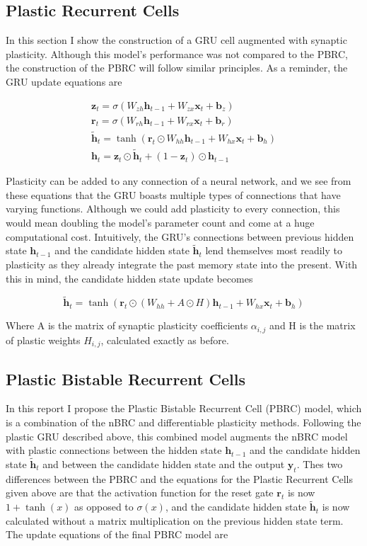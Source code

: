 \subsection*{Plastic Recurrent Cells}

In this section I show the construction of a GRU cell augmented with synaptic plasticity. Although this model's performance was not compared to the PBRC, the construction of the PBRC will follow similar principles.
As a reminder, the GRU update equations are

\begin{gather*}
	\mathbf{z}_t = \sigma(W_{zh} \mathbf{h}_{t-1} + W_{zx} \mathbf{x}_t + \mathbf{b}_z)\\
	\mathbf{r}_t = \sigma(W_{rh} \mathbf{h}_{t-1} + W_{rx} \mathbf{x}_t + \mathbf{b}_r)\\
	\mathbf{\tilde{h}}_t = \tanh(\mathbf{r}_t \odot W_{hh} \mathbf{h}_{t-1} + W_{hx} \mathbf{x}_t + \mathbf{b}_h)\\
	\mathbf{h}_t = \mathbf{z}_t \odot \mathbf{\tilde{h}}_t + (1 - \mathbf{z}_t) \odot \mathbf{h}_{t-1}
\end{gather*}

Plasticity can be added to any connection of a neural network, and we see from these equations that the GRU boasts multiple types of connections that have varying functions. Although we could add plasticity to every connection, this would mean doubling the model's parameter count and come at a huge computational cost. Intuitively, the GRU's connections between previous hidden state \(\mathbf{h}_{t-1}\) and the candidate hidden state \(\mathbf{\tilde{h}}_t\) lend themselves most readily to plasticity as they already integrate the past memory state into the present. With this in mind, the candidate hidden state update becomes

\[ \mathbf{\tilde{h}}_t = \tanh(\mathbf{r}_t \odot (W_{hh} + A \odot H) \mathbf{h}_{t-1} + W_{hx} \mathbf{x}_t + \mathbf{b}_h) \]

Where A is the matrix of synaptic plasticity coefficients \(\alpha_{i,j}\) and H is the matrix of plastic weights \(H_{i,j}\), calculated exactly as before.

\subsection*{Plastic Bistable Recurrent Cells}

In this report I propose the Plastic Bistable Recurrent Cell (PBRC) model, which is a combination of the nBRC and differentiable plasticity methods. Following the plastic GRU described above, this combined model augments the nBRC model with plastic connections between the hidden state \(\mathbf{h}_{t-1}\) and the candidate hidden state \(\mathbf{\tilde{h}}_t\) and between the candidate hidden state and the output \(\mathbf{y}_t\). Thes two differences between the PBRC and the equations for the Plastic Recurrent Cells given above are that the activation function for the reset gate \(\mathbf{r}_t\) is now \(1 + \tanh(x)\) as opposed to \(\sigma(x)\), and the candidate hidden state \(\mathbf{\tilde{h}}_t\) is now calculated without a matrix multiplication on the previous hidden state term.
\clearpage
The update equations of the final PBRC model are

